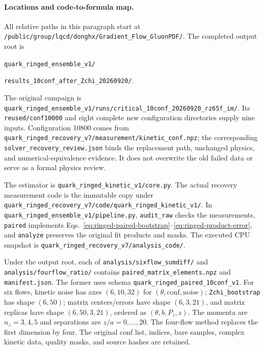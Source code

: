 \documentclass[11pt]{article}
\numberwithin{equation}{section}
\begin{document}
\paragraph{Locations and code-to-formula map.}
All relative paths in this paragraph start at
\nolinkurl{/public/group/lqcd/donghx/Gradient_Flow_GluonPDF/}.
The completed output root is
\begin{center}
 \nolinkurl{quark_ringed_ensemble_v1/}\par
 \nolinkurl{results_10conf_after_Zchi_20260920/}.
\end{center}
The original campaign is
\nolinkurl{quark_ringed_ensemble_v1/runs/critical_10conf_20260920_rz65f_im/}.
Its \texttt{reused/conf10000} and eight complete new configuration
directories supply nine inputs. Configuration 10800 comes from
\nolinkurl{quark_ringed_recovery_v7/measurement/kinetic_conf.npz};
the corresponding \texttt{solver\_recovery\_review.json} binds the
replacement path, unchanged physics, and numerical-equivalence evidence.
It does not overwrite the old failed data or serve as a formal physics review.

The estimator is \texttt{quark\_ringed\_kinetic\_v1/core.py}.
The actual recovery measurement code is the immutable copy under
\nolinkurl{quark_ringed_recovery_v7/code/quark_ringed_kinetic_v1/}.
In \nolinkurl{quark_ringed_ensemble_v1/pipeline.py}, \texttt{audit\_raw}
checks the measurements, \texttt{paired} implements
Eqs.~\eqref{eq:ringed-paired-bootstrap}--\eqref{eq:ringed-product-error},
and \texttt{analyze} preserves the original fit products and masks.
The executed CPU snapshot is
\nolinkurl{quark_ringed_recovery_v7/analysis_code/}.

Under the output root, each of
\nolinkurl{analysis/sixflow_sumdiff/} and
\nolinkurl{analysis/fourflow_ratio/} contains
\texttt{paired\_matrix\_elements.npz} and \texttt{manifest.json}.
The former uses schema \texttt{quark\_ringed\_paired\_10conf\_v1}.
For six flows, kinetic noise has axes \((6,10,32)\) for
\((\theta,\mathrm{conf},\mathrm{noise})\);
\texttt{Zchi\_bootstrap} has shape \((6,50)\);
matrix centers/errors have shape \((6,3,21)\), and matrix replicas have
shape \((6,50,3,21)\), ordered as \((\theta,b,P_z,z)\).
The momenta are \(n_z=3,4,5\) and separations are \(z/a=0,\ldots,20\).
The four-flow method replaces the first dimension by four.
The original conf list, indices, bare samples, complex kinetic data, quality
masks, and source hashes are retained.
\end{document}
